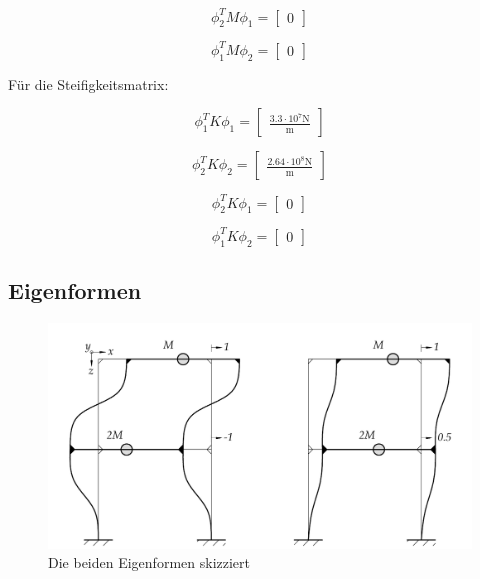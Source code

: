 \documentclass[
  letterpaper,
  DIV=11]{scrreprt}
\begin{document}
\begin{equation}\phi_{2}^{T} M \phi_{1} = \left[\begin{matrix}0\end{matrix}\right]\end{equation}

\begin{equation}\phi_{1}^{T} M \phi_{2} = \left[\begin{matrix}0\end{matrix}\right]\end{equation}

Für die Steifigkeitsmatrix:

\begin{equation}\phi_{1}^{T} K \phi_{1} = \left[\begin{matrix}\frac{3.3 \cdot 10^{7} \text{N}}{\text{m}}\end{matrix}\right]\end{equation}

\begin{equation}\phi_{2}^{T} K \phi_{2} = \left[\begin{matrix}\frac{2.64 \cdot 10^{8} \text{N}}{\text{m}}\end{matrix}\right]\end{equation}

\begin{equation}\phi_{2}^{T} K \phi_{1} = \left[\begin{matrix}0\end{matrix}\right]\end{equation}

\begin{equation}\phi_{1}^{T} K \phi_{2} = \left[\begin{matrix}0\end{matrix}\right]\end{equation}

\hypertarget{eigenformen}{%
\subsection{Eigenformen}\label{eigenformen}}

\begin{figure}[H]

{\centering \includegraphics{index_files/mediabag/bilder/aufgabe_mms_steif_eigenvektoren.pdf}

}

\caption{\label{fig-mms_steif_eigenformen}Die beiden Eigenformen
skizziert}

\end{figure}
\end{document}
